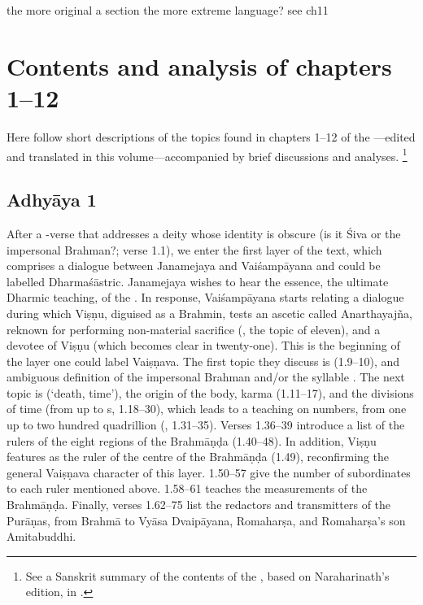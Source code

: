   


\CHECK the more original a section the more extreme language? see ch11


\vfill
\pagebreak


\section{Contents and analysis of chapters 1--12}\label{contentsof1_12}

Here follow short descriptions of the topics found in chapters 1--12
of the \VSS---edited and translated in this volume---accompanied 
by brief discussions and analyses.%
		\footnote{See a Sanskrit summary of the 
					contents of the \VSS,
				    based on Naraharinath's edition,
					in \verify. }
					
\subsection{Adhyāya 1}\label{contents_of_ch01}
After a -verse that addresses a 
deity whose identity is obscure (is it Śiva or the 
impersonal Brahman?; verse 1.1), we enter the first layer 
of the text, which comprises a dialogue between Janamejaya and 
Vaiśampāyana and could be labelled Dharmaśāstric.
Janamejaya wishes to hear the essence, the ultimate Dharmic teaching, 
of the \MBh. In response, Vaiśampāyana starts relating 
a dialogue during which Viṣṇu, diguised as a Brahmin, 
tests an ascetic called Anarthayajña, reknown for performing 
non-material sacrifice (, 
the topic of  eleven), and 
a devotee of Viṣṇu (which becomes clear in  twenty-one). 
This is the beginning of the layer one could label Vaiṣṇava. 
The first topic they discuss is  (1.9--10), and 
ambiguous definition of the impersonal Brahman and/or the syllable . 
The next topic is  (`death, time'), the origin of the body, karma (1.11--17), 
and the divisions of time (from  up to s, 1.18--30), 
which leads to a teaching on numbers, from one up to 
two hundred quadrillion (, 1.31--35).
Verses 1.36--39 introduce a list of the rulers of the eight 
regions of the Brahmāṇḍa (1.40--48). 
In addition, Viṣṇu features as the ruler of the centre of the Brahmāṇḍa (1.49),  
reconfirming the general Vaiṣṇava character of this layer. 
1.50--57 give the number of subordinates to each ruler mentioned above. 
1.58--61 teaches the measurements of the Brahmāṇḍa. 
Finally, verses 1.62--75 list the redactors and transmitters of the Purāṇas, 
from Brahmā to Vyāsa Dvaipāyana, Romaharṣa, and Romaharṣa's son Amitabuddhi.


